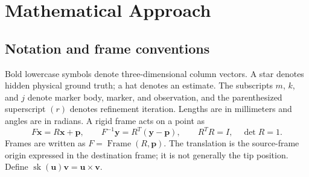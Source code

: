 \documentclass[11pt]{article}
\newcommand{\vct}[1]{\bm{#1}}
\newcommand{\sk}{\operatorname{sk}}
\newcommand{\Frame}{\operatorname{Frame}}
\begin{document}
\section{Mathematical Approach}
\subsection{Notation and frame conventions}
Bold lowercase symbols denote three-dimensional column vectors. A star denotes hidden physical ground truth; a hat denotes an estimate. The subscripts $m$, $k$, and $j$ denote marker body, marker, and observation, and the parenthesized superscript $(r)$ denotes refinement iteration. Lengths are in millimeters and angles are in radians. A rigid frame acts on a point as
\begin{equation}
F\vct{x}=R\vct{x}+\vct{p},\qquad
F^{-1}\vct{y}=R^T(\vct{y}-\vct{p}),\qquad R^TR=I,\quad\det R=1.
\end{equation}
Frames are written as $F=\Frame(R,\vct{p})$. The translation is the source-frame origin expressed in the destination frame; it is not generally the tip position. Define $\sk(\vct{u})\vct{v}=\vct{u}\times\vct{v}$.
\end{document}
